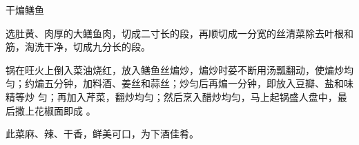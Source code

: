 \begin{recipe}{干煸鳝鱼}

\ingredients


\cooking

\step 选肚黄、肉厚的大鳝鱼肉，切成二寸长的段，再顺切成一分宽的丝清菜除去叶根和
筋，淘洗干净，切成九分长的段。

\step 锅在旺火上倒入菜油烧红，放入鳝鱼丝煸炒，煸炒时荽不断用汤瓢翻动，使煸炒均
匀；约煸五分钟，加料酒、姜丝和蒜丝；炒匀后再煸一分钟，即放入豆瓣、盐和味精等炒
匀；再加入芹菜，翻炒均匀；然后烹入醋炒均匀，马上起锅盛人盘中，最后撒上花椒面即成
。

\features

此菜麻、辣、干香，鲜美可口，为下酒佳肴。

\end{recipe}

